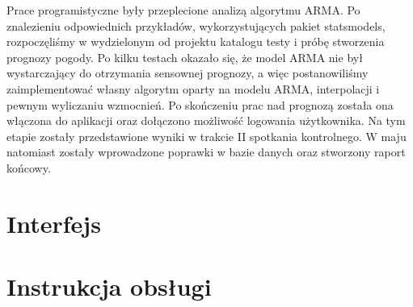 \documentclass[a4paper]{article}
\begin{document}
Prace programistyczne były przeplecione analizą algorytmu ARMA. Po znalezieniu odpowiednich przykładów, wykorzystujących pakiet statsmodels, rozpoczęliśmy w wydzielonym od projektu katalogu testy i próbę stworzenia prognozy pogody. Po kilku testach okazało się, że model ARMA nie był wystarczający do otrzymania sensownej prognozy, a więc postanowiliśmy zaimplementować własny algorytm oparty na modelu ARMA, interpolacji i pewnym wyliczaniu wzmocnień.
\newline
Po skończeniu prac nad prognozą została ona włączona do aplikacji oraz dołączono możliwość logowania użytkownika.
\newline
Na tym etapie zostały przedstawione wyniki w trakcie II spotkania kontrolnego. 
W maju natomiast zostały wprowadzone poprawki w bazie danych oraz stworzony raport końcowy.

\section{Interfejs}


\section{Instrukcja obsługi}

\end{document}
